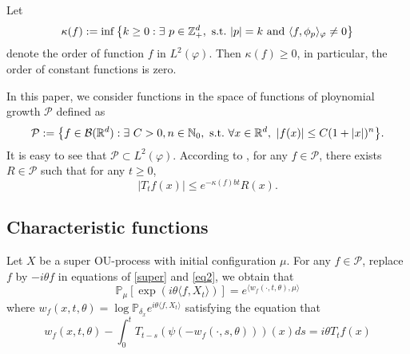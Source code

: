 \documentclass[12pt, a4paper]{amsart}
\theoremstyle{definition}
\numberwithin{equation}{section}
\begin{document}
Let
\begin{equation}\label{order}
    \kappa(f)
    :=\inf \left \{k\geq 0: \exists ~ p\in \mathbb{Z}_+^d,{\rm ~s.t.~}|p|=k {\rm ~and~}  \langle f, \phi_p \rangle_{\varphi}\neq 0\right \}
\end{equation}
denote the order of function $f$ in $L^2(\varphi)$. Then $ \kappa(f)\geq 0$, in particular, the order of constant functions is zero.

In this paper, we consider functions in the space of functions of ploynomial growth $\mathcal{P}$ defined as
\begin{equation}
     \mathcal{P}
     :=\big \{f\in \mathcal{B}(\mathbb{R}^d):\exists~ C>0, n \in \mathbb N_0, {\rm ~s.t.~} \forall x\in \mathbb{R}^d,~ |f(x)|\leq C(1+|x|)^n\big\}.
\end{equation}
It is easy to see that $\mathcal{P} \subset L^2(\varphi)$. 
According to \cite[Fact 1.2]{MM},
for any $f \in \mathcal{P}$, there exists $R \in \mathcal{P}$ such that for any $t\geq 0$,
\begin{equation}\label{semigroupineq}
    |T_tf(x)| \leq e^{-\kappa(f)bt}R(x).
\end{equation}

\subsection{Characteristic functions}
 Let $X$ be a super OU-process with initial configuration $\mu$. For any $f \in \mathcal{P}$,
replace $f$ by $-i\theta f$ in equations of \eqref{super} and \eqref{eq2}, we obtain that
\begin{equation}\label{characteristic}
    \mathbb{P}_{\mu}\left[\exp(i\theta \langle  f,X_t\rangle)\right]=e^{\langle w_f(\cdot,t,\theta),\mu\rangle}
\end{equation}
where $w_f(x,t,\theta)=\log \mathbb{P}_{\delta_x}e^{i\theta\langle f,X_t\rangle}$ satisfying the equation that
\begin{equation}\label{charequation}
    w_f(x,t,\theta)-\int_0^t T_{t-s} \left(\psi (-w_f(\cdot,s,\theta))\right)(x)ds=i\theta T_tf(x)
\end{equation}
\end{document}

